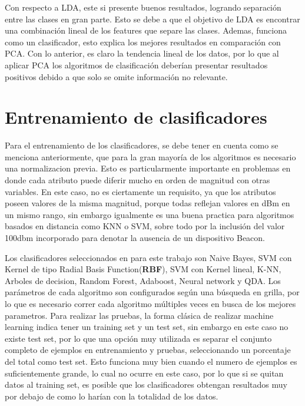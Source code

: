 Con respecto a LDA, este si presente buenos resultados, logrando separación entre las clases en gran parte. Esto se debe a que el objetivo de LDA es encontrar una combinación lineal de los features que separe las clases. Ademas, funciona como un clasificador, esto explica los mejores resultados en comparación con PCA. Con lo anterior, es claro la tendencia lineal de los datos, por lo que al aplicar PCA los algoritmos de clasificación deberían presentar resultados positivos debido a que solo se omite información no relevante.

\section{Entrenamiento de clasificadores}



Para el entrenamiento de los clasificadores, se debe tener en cuenta como se menciona anteriormente, que para la gran mayoría de los algoritmos es necesario una normalizacion previa. Esto es particularmente importante en problemas en donde cada atributo puede diferir mucho en orden de magnitud con otras variables. En este caso, no es ciertamente un requisito, ya que los atributos poseen valores de la misma magnitud, porque todas reflejan valores en dBm en un mismo rango, sin embargo igualmente es una buena practica para algoritmos basados en distancia como KNN o SVM, sobre todo por la inclusión del valor 100dbm incorporado para denotar la ausencia de un dispositivo Beacon.

Los clasificadores seleccionados en para este trabajo son Naive Bayes, SVM con Kernel de tipo Radial Basis Function(\textbf{RBF}), SVM con Kernel lineal, K-NN, Arboles de decision, Random Forest, Adaboost, Neural network y QDA. Los parámetros de cada algoritmo son configurados según una búsqueda en grilla, por lo que es necesario correr cada algoritmo múltiples veces en busca de los mejores parametros. Para realizar las pruebas, la forma clásica de realizar machine learning indica tener un training set y un test set, sin embargo en este caso no existe test set, por lo que una opción muy utilizada es separar el conjunto completo de ejemplos en entrenamiento y pruebas, seleccionando un porcentaje del total como test set. Esto funciona muy bien cuando el numero de ejemplos es suficientemente grande, lo cual no ocurre en este caso, por lo que si se quitan datos al training set, es posible que los clasificadores obtengan resultados muy por debajo de como lo harían con la totalidad de los datos.

